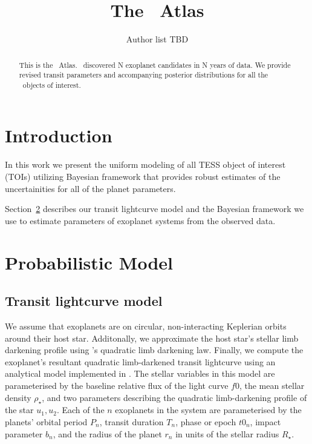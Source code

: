 \documentclass[modern]{aastex63}
\begin{document}
\title{The \tess\ Atlas}



\author{Author list TBD}
% 


\begin{abstract}

This is the \tess\ Atlas.
\tess\ discovered N exoplanet candidates in N years of data.
We provide revised transit parameters and accompanying posterior distributions for all the \tess\ objects of interest.

\end{abstract}


\section{Introduction} \label{sec:intro}

In this work we present the uniform modeling of all TESS object of interest (TOIs) utilizing Bayesian framework that provides robust estimates of the uncertainities for all of the planet parameters.

Section~\ref{sec:prob-model} describes our transit lightcurve model and the Bayesian framework we use to estimate parameters of exoplanet systems from the observed data.

\section{Probabilistic Model} \label{sec:prob-model}

\subsection{Transit lightcurve model}
We assume that exoplanets are on circular, non-interacting Keplerian orbits around their host star.
Additonally, we approximate the host star's stellar limb darkening profile using \citet{Kipping:2013}'s quadratic limb darkening law.
Finally, we compute the exoplanet's resultant quadratic limb-darkened transit lightcurve using an analytical model implemented in \starry.
The stellar variables in this model are parameterised by
the baseline relative flux of the light curve $f0$,
the mean stellar density $\rho_\star$,
and two parameters describing the quadratic limb-darkening profile of the
star $u_1, u_2$.
Each of the $n$ exoplanets in the system are parameterised by the planets'
orbital period $P_{n}$,
transit duration $T_{n}$,
phase or epoch $t0_n$,
impact parameter $b_n$,
and the radius of the planet $r_n$ in units of the stellar radius $R_\star$.
\end{document}

